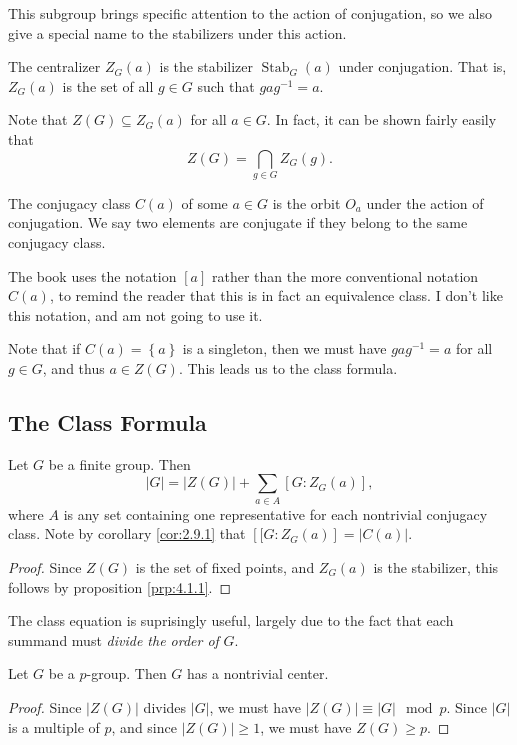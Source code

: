 This subgroup brings specific attention to the action of conjugation, so we also give a special name to the stabilizers under this action.
\begin{definition}[Centralizer]\label{dfn:4.1.3}
	The centralizer $Z_G(a)$ is the stabilizer $\operatorname{Stab}_G (a)$ under conjugation. That is, $Z_G(a)$ is the set of all $g\in G$ such that $gag^{-1} =a$.
\end{definition}
Note that $Z(G)\subseteq Z_G(a)$ for all $a\in G$. In fact, it can be shown fairly easily that
\[
	Z(G)=\bigcap_{g\in G} Z_G(g)
.\]
\begin{definition}\label{dfn:4.1.4}
	The conjugacy class $C(a)$ of some $a\in G$ is the orbit $O_a$ under the action of conjugation. We say two elements are conjugate if they belong to the same conjugacy class.
\end{definition}
The book uses the notation $\left[ a \right] $ rather than the more conventional notation $C(a)$, to remind the reader that this is in fact an equivalence class. I don't like this notation, and am not going to use it.

Note that if $C(a)=\left\{ a \right\} $ is a singleton, then we must have $gag^{-1} =a$ for all $g\in G$, and thus $a\in Z(G)$. This leads us to the class formula.

\subsection{The Class Formula}

\begin{proposition}\label{prp:4.1.2}
	Let $G$ be a finite group. Then
	\[
		\left| G \right| =\left| Z(G) \right| + \sum_{a\in A} \left[ G : Z_G(a) \right] 
	,\]
where $A$ is any set containing one representative for each nontrivial conjugacy class. Note by corollary \ref{cor:2.9.1} that $\left[ [G : Z_G(a) \right] = \left| C(a) \right| $.
\end{proposition}
\begin{proof}
	Since $Z(G)$ is the set of fixed points, and $Z_G(a)$ is the stabilizer, this follows by proposition \ref{prp:4.1.1}.
\end{proof}
The class equation is suprisingly useful, largely due to the fact that each summand must \emph{divide the order of} $G$.
\begin{corollary}\label{cor:4.1.2}
	Let $G$ be a $p$-group. Then $G$ has a nontrivial center.
\end{corollary}
\begin{proof}
	Since $\left| Z(G) \right| $ divides $\left| G \right| $, we must have $\left| Z(G) \right| \equiv \left| G \right| \mod{p}$. Since $\left| G \right| $ is a multiple of $p$, and since $\left| Z(G) \right| \geq 1$, we must have $Z(G)\geq p$.
\end{proof}

